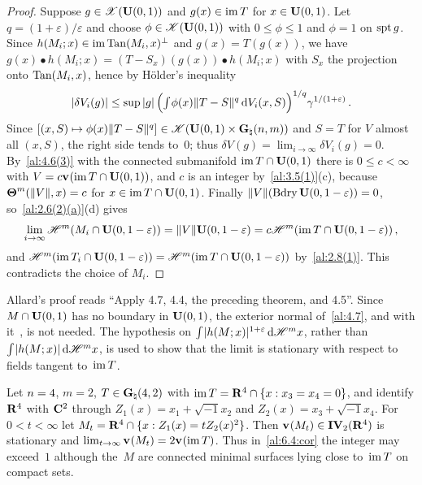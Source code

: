 \begin{proof}
    Suppose $g \in \mathscr{X}(\mathbf{U}(0,1))$ and $g(x) \in \operatorname{im} T$ for $x \in \mathbf{U}(0,1)$. Let $q = (1 +
    \varepsilon)/\varepsilon$ and choose $\phi \in \mathscr{K}(\mathbf{U}(0,1))$ with $0 \le \phi \le 1$
    and $\phi = 1$ on $\operatorname{spt} g$. Since $h(M_i;x) \in \operatorname{im} \operatorname{Tan}(M_i,x)^\perp$ and $g(x) = T(g(x))$,
    we have $g(x) \bullet h(M_i;x) = (T - S_x)(g(x)) \bullet h(M_i;x)$ with $S_x$ the projection
    onto $\operatorname{Tan}(M_i,x)$, hence by H\"older's inequality
    \begin{displaymath}
        |\delta V_i(g)| \le \sup |g| \, \Big( {\textstyle\int_{}^{}} \phi(x) \|T - S\|^q \,\mathrm{d} V_i(x,S)
        \Big)^{1/q} \gamma^{1/(1+\varepsilon)} \,.
    \end{displaymath}
    Since $[(x,S) \mapsto \phi(x) \|T - S\|^q] \in \mathscr{K}(\mathbf{U}(0,1) \times
    \mathbf{G}_{\natural}(n,m))$ and $S = T$ for $V$ almost all $(x,S)$, the right side tends to~$0$; thus
    $\delta V(g) = \lim_{i \to \infty} \delta V_i(g) = 0$. By~\ref{al:4.6(3)} with the connected
    submanifold $\operatorname{im} T \cap \mathbf{U}(0,1)$ there is $0 \le c < \infty$ with $V = c \mathbf{v}_{}(\operatorname{im} T
    \cap \mathbf{U}(0,1))$, and $c$ is an integer by~\ref{al:3.5(1)}(c), because
    $\boldsymbol{\Theta}^m(\|V\|,x) = c$ for $x \in \operatorname{im} T \cap \mathbf{U}(0,1)$. Finally $\|V\|(\operatorname{Bdry}
    \mathbf{U}(0,1-\varepsilon)) = 0$, so~\ref{al:2.6(2)(a)}(d) gives
    \begin{displaymath}
        \lim_{i \to \infty} \mathscr{H}^m(M_i \cap \mathbf{U}(0,1-\varepsilon)) = \|V\|
        \mathbf{U}(0,1-\varepsilon) = c \mathscr{H}^m(\operatorname{im} T \cap \mathbf{U}(0,1-\varepsilon)) \,,
    \end{displaymath}
    and $\mathscr{H}^m(\operatorname{im} T_i \cap \mathbf{U}(0,1-\varepsilon)) = \mathscr{H}^m(\operatorname{im} T \cap
    \mathbf{U}(0,1-\varepsilon))$ by~\ref{al:2.8(1)}. This contradicts the choice of $M_i$.
\end{proof}

\begin{remark}
    \label{rem:6.4:cor}
    Allard's proof reads ``Apply 4.7, 4.4, the preceding theorem, and 4.5''. Since $M \cap
    \mathbf{U}(0,1)$ has no boundary in $\mathbf{U}(0,1)$, the exterior normal of~\ref{al:4.7}, and
    with it~\cite[4.5.6, 4.5.12]{Federer1969}, is not needed. The hypothesis on ${\textstyle\int_{}^{}}
    |h(M;x)|^{1+\varepsilon} \,\mathrm{d} \mathscr{H}^m x$, rather than ${\textstyle\int_{}^{}} |h(M;x)| \,\mathrm{d} \mathscr{H}^m x$, is
    used to show that the limit is stationary with respect to fields tangent to~$\operatorname{im} T$.
\end{remark}

\begin{example}
    \label{al:6.4:rem}
    Let $n = 4$, $m = 2$, $T \in \mathbf{G}_{\natural}(4,2)$ with $\operatorname{im} T = \mathbf{R}^4 \cap \{ x : x_3 = x_4 = 0
    \}$, and identify $\mathbf{R}^4$ with $\mathbf{C}^2$ through $Z_1(x) = x_1 + \sqrt{-1} x_2$ and $Z_2(x) = x_3
    + \sqrt{-1} x_4$. For $0 < t < \infty$ let $M_t = \mathbf{R}^4 \cap \{ x : Z_1(x) = t Z_2(x)^2 \}$.
    Then $\mathbf{v}_{}(M_t) \in \mathbf{IV}_{2}(\mathbf{R}^4)$ is stationary and $\lim_{t \to \infty} \mathbf{v}_{}(M_t) = 2
    \mathbf{v}_{}(\operatorname{im} T)$. Thus in~\ref{al:6.4:cor} the integer may exceed~$1$ although the~$M$ are
    connected minimal surfaces lying close to~$\operatorname{im} T$ on compact sets.
\end{example}

